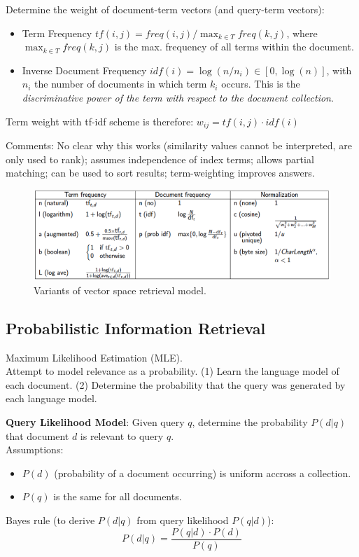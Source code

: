    Determine the weight of document-term vectors (and query-term vectors):
    \begin{itemize}
      \item Term Frequency $tf(i,j)=freq(i,j)/\max_{k\in T}{freq(k,j)}$, where $\max_{k\in T}{freq(k,j)}$ is the max. frequency of all terms within the document.
      \item Inverse Document Frequency $idf(i)=\log{(n/n_i)}\in [0,\log{(n)}]$, with $n_i$ the number of documents in which term $k_i$ occurs. This is the \emph{discriminative power of the term with respect to the document collection}.
    \end{itemize}
    Term weight with tf-idf scheme is therefore: $w_{ij}=tf(i,j)\cdot idf(i)$

    Comments: No clear why this works (similarity values cannot be interpreted, are only used to rank); assumes independence of index terms; allows partial matching; can be used to sort results; term-weighting improves answers.

    \begin{figure}[htp]
      \centering
        \includegraphics[width=\textwidth]{images/vvsrm.png}
        \caption{Variants of vector space retrieval model.}
        \label{fig:vvsrm}
    \end{figure}


  \subsection{Probabilistic Information Retrieval} %
  \label{sub:probabilistic_information_retrieval}
    Maximum Likelihood Estimation (MLE).\\
    Attempt to model relevance as a probability. (1) Learn the language model of each document. (2) Determine the probability that the query was generated by each language model.

    \textbf{Query Likelihood Model}: Given query $q$, determine the probability $P(d|q)$ that document $d$ is relevant to query $q$.\\
    Assumptions:
    \begin{itemize}
      \item $P(d)$ (probability of a document occurring) is uniform accross a collection.
      \item $P(q)$ is the same for all documents.
    \end{itemize}
    Bayes rule (to derive $P(d|q)$ from query likelihood $P(q|d)$): $$P(d|q)=\frac{P(q|d)\cdot P(d)}{P(q)}$$

